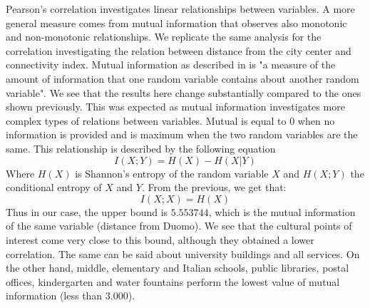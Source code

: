 \documentclass[12pt]{article}
\begin{document}
Pearson's correlation investigates linear relationships between variables. A more general measure comes from mutual information that observes also monotonic and non-monotonic relationships. We replicate the same analysis for the correlation investigating the relation between distance from the city center and connectivity index. Mutual information as described in \cite{elements} is "a measure of the amount of information that one random variable contains about another random variable". We see that the results here change substantially compared to the ones shown previously. This was expected as mutual information investigates more complex types of relations between variables. Mutual is equal to 0 when no information is provided and is maximum when the two random variables are the same. This relationship is described by the following equation
\[I(X;Y)=H(X)-H(X|Y)\]
Where $H(X)$ is Shannon's entropy of the random variable $X$ and $H(X;Y)$ the conditional entropy of $X$ and $Y$. From the previous, we get that: 
\[I(X;X)=H(X)\]
Thus in our case, the upper bound is $5.553744$, which is the mutual information of the same variable (distance from Duomo). We see that the cultural points of interest come very close to this bound, although they obtained a lower correlation. The same can be said about university buildings and all services. On the other hand, middle, elementary and Italian schools, public libraries, postal offices, kindergarten and water fountains perform the lowest value of mutual information (less than $3.000$). 
\end{document}
